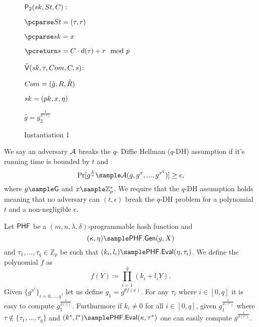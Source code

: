 \begin{figure}[htb!]
{\begin{minipage}[t]{0.5\textwidth}
              \underline{$\mathsf{P}_2(sk,St,C):$}
            \begin{nicodemus}
            	\item $\pcparse \st = (\tau,r)$
		\item $\pcparse \sk = x$
                \item $\pcreturn \s =\c\cdot d(\tau) + r \mod p$
            \end{nicodemus}
                        \underline{$\tilde{\mathsf{V}}(sk,\tau,Com, C,s)$}:
            \begin{nicodemus}
                \item \pcparse $Com = (\hat{g},R,\hat{R})$
                \item \pcparse $sk = (pk,x,\eta)$
                \item \pcif $\hat{g} = g_2^{\frac{1}{d(\tau)}}$ 
                \item \quad \pcthen {}
                \item \pcelse {}
            \end{nicodemus}
        \end{minipage}
    }
    \caption{Instantiation 1}
    \label{fig:prf-security}
\end{figure}

\begin{definition}[$q$-DH Assumption]
We say an adversary $\mathcal{A}$ breaks the $q$- Diffie Hellman ($q$-DH) assumption if it's running time is bounded by $t$ and
$$\Pr[g^{\frac{1}{x}} \sample \adv(g,g^x,...,g^{x^q})] \geq \epsilon,$$
where 
$g \sample \G$ and $x \sample \mathbb{Z}_p^*$.
We require that the $q$-DH assumption holds meaning that no adversary can $(t, \epsilon)$ break the $q$-DH problem for a polynomial $t$ and a non-negligible $\epsilon$.
\end{definition}
\begin{lemma}
	Let $\mathsf{PHF}$ be a $(m,n, \lambda, \delta)$-programmable hash function and 
	$$(\kappa, \eta)\sample \phfGen(g,X)$$
	and $\tau_1,...,\tau_q \in \mathbb{Z}_p$ be such that
	$(k_i,l_i) \sample \phfEval(\eta,\tau_i)$.
	We define the polynomial $f$ as 
	$$f(Y) \coloneqq \prod_{i=1}^q (k_i + l_iY).$$
	Given $\{g^{x^i}\}_{i=0,...,q}$, let us define $g_1 = g^{\theta f(x)}$. For any $\tau_i$ where $i \in [0,q]$ it is easy to compute $g_1^\frac{1}{d(\tau_i) }$. Furthurmore if $k_i \neq 0$ for all $i \in [0,q]$, given 
	$g_1^\frac{1}{d(\tau^*) }$ where $\tau \notin \{\tau_1,...,\tau_q\}$ and $(k^*,l^*) \sample \phfEval(\kappa, \tau^*)$ one can easily compute $g^\frac{1}{d(\tau^*)}$.
	
\end{lemma}

